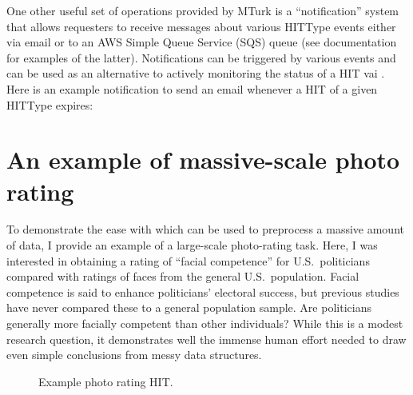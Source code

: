 One other useful set of operations provided by MTurk is a
``notification'' system that allows requesters to receive messages
about various HITType events either via email or to an AWS Simple
Queue Service (SQS) queue (see  documentation for examples
of the latter). Notifications can be triggered by various events and
can be used as an alternative to actively monitoring the status of a
HIT vai . Here is an example notification to send an
email whenever a HIT of a given HITType expires:



\section{An example of massive-scale photo rating}

To demonstrate the ease with which  can be used to
preprocess a massive amount of data, I provide an example of a
large-scale photo-rating task. Here, I was interested in obtaining a
rating of ``facial competence'' for U.S.~politicians compared with
ratings of faces from the general U.S.~population. Facial competence
is said to enhance politicians' electoral success, but previous
studies have never compared these to a general population sample. Are
politicians generally more facially competent than other individuals?
While this is a modest research question, it demonstrates well the
immense human effort needed to draw even simple conclusions from messy
data structures.

\begin{figure}
\begin{center}
\end{center}
\caption{Example photo rating HIT.}\label{fig:hit2}
\end{figure}

